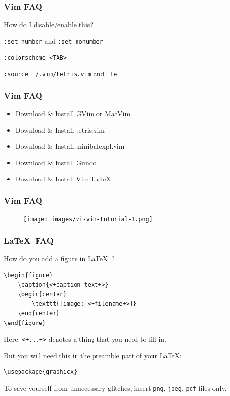 \documentclass[hyperref={colorlinks=false},handout,10pt]{beamer}
\let\olditem\item
\renewcommand{\item}{\setlength{\itemsep}{0.5\baselineskip}\olditem}
\def\LaTeXs{\LaTeX\ }
\begin{document}
\begin{frame}
    \frametitle{Vim FAQ}
    \begin{block}{How do I disable/enable this?}
        \begin{description}
            \item[number column] \texttt{:set number} and \texttt{:set nonumber}
            \item[colorscheme] \texttt{:colorscheme <TAB>} 
            \item[tetris] \texttt{:source ~/.vim/tetris.vim} and \texttt{\ te}
        \end{description}
    \end{block}
    
\end{frame}

\begin{frame}
    \frametitle{Vim FAQ}
    \begin{itemize}
        \item Download \& Install GVim or MacVim
        \item Download \& Install tetris.vim
        \item Download \& Install minibufexpl.vim
        \item Download \& Install Gundo 
        \item Download \& Install Vim-LaTeX
    \end{itemize}
\end{frame}

\begin{frame}
    \frametitle{Vim FAQ}
    \begin{figure}
        \begin{center}
            \texttt{[image: images/vi-vim-tutorial-1.png]}
        \end{center}
    \end{figure}
\end{frame}

\begin{frame}[fragile]
    \frametitle{\LaTeXs FAQ}
    \begin{block}{How do you add a figure in \LaTeXs?}
    \begin{lstlisting}
\begin{figure}
    \caption{<+caption text+>}
    \begin{center}
        \texttt{[image: <+filename+>]}
    \end{center}
\end{figure}
    \end{lstlisting}
     Here, \verb$<+...+>$ denotes a thing that you need to fill in.
    \end{block}
    \begin{block}{But you will need this in the preamble part of your \LaTeX:}
    \begin{lstlisting}
\usepackage{graphicx} 
    \end{lstlisting}
    To save yourself from unnecessary glitches, insert \texttt{png},
    \texttt{jpeg}, \texttt{pdf} files only.
    \end{block}
\end{frame}
\end{document}
